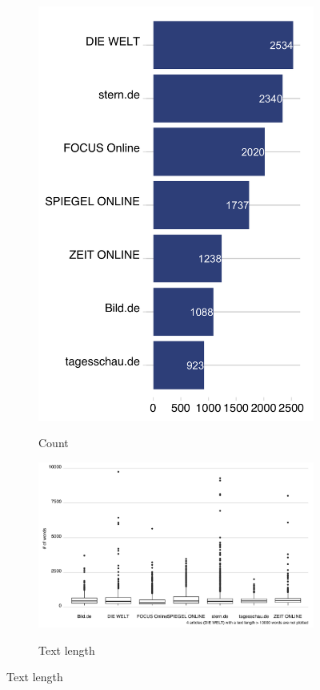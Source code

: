 \documentclass[12pt,a4paper,notitlepage]{article}
\begin{document}
\begin{figure}[H]
	\begin{center}
	\caption{News articles}
		\begin{subfigure}[normla]{0.3\textwidth}
			\caption{Count}
			\includegraphics[width=\textwidth]{../figs/article_sum.png}
			\label{fig_news_count}
		\end{subfigure}
		\begin{subfigure}[normla]{0.69\textwidth}
			\caption{Text length}
			\includegraphics[width=\textwidth]{../figs/news_releases_textlength}
			\label{fig_length}
		\end{subfigure}
	\end{center}
\end{figure}
\end{document}
